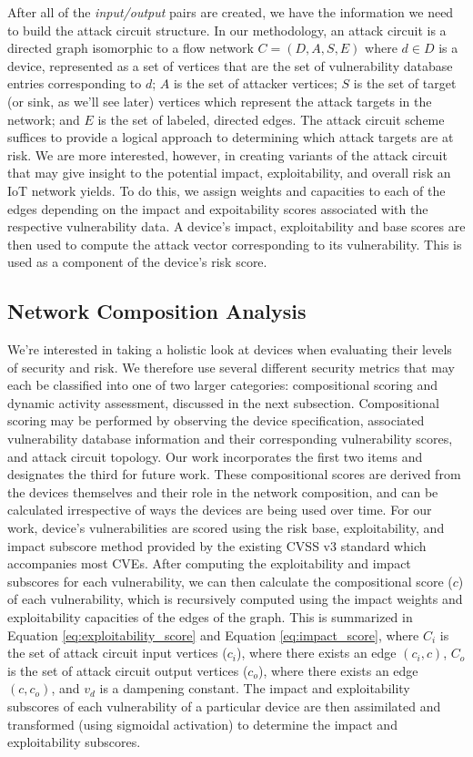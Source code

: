 After all of the \textit{input/output} pairs are created, we have the information we need to build the attack circuit structure. In our methodology, an attack circuit is a directed graph isomorphic to a flow network $C = (D,A,S,E)$ where $d \in D$ is a device, represented as a set of vertices that are the set of vulnerability database entries corresponding to $d$; $A$ is the set of attacker vertices; $S$ is the set of target (or sink, as we'll see later) vertices which represent the attack targets in the network; and $E$ is the set of labeled, directed edges. The attack circuit scheme suffices to provide a logical approach to determining which attack targets are at risk. We are more interested, however, in creating variants of the attack circuit that may give insight to the potential impact, exploitability, and overall risk an IoT network yields. To do this, we assign weights and capacities to each of the edges depending on the impact and expoitability scores associated with the respective vulnerability data. A device's impact, exploitability and base scores are then used to compute the attack vector corresponding to its vulnerability. This is used as a component of the device's risk score.

\subsection{Network Composition Analysis}

We're interested in taking a holistic look at devices when evaluating their levels of security and risk. We therefore use several different security metrics that may each be classified into one of two larger categories: compositional scoring and dynamic activity assessment, discussed in the next subsection. Compositional scoring may be performed by observing the device specification, associated vulnerability database information and their corresponding vulnerability scores, and attack circuit topology. Our work incorporates the first two items and designates the third for future work. These compositional scores are derived from the devices themselves and their role in the network composition, and can be calculated irrespective of ways the devices are being used over time. For our work, device's vulnerabilities are scored using the risk base, exploitability, and impact subscore method provided by the existing CVSS v3 standard which accompanies most CVEs. After computing the exploitability and impact subscores for each vulnerability, we can then calculate the compositional score ($c$) of each vulnerability, which is recursively computed using the impact weights and exploitability capacities of the edges of the graph. This is summarized in Equation \ref{eq:exploitability_score} and Equation \ref{eq:impact_score}, where $C_i$ is the set of attack circuit input vertices ($c_i$), where there exists an edge $(c_i,c)$, $C_o$ is the set of attack circuit output vertices ($c_o$), where there exists an edge $(c,c_o)$, and $v_d$ is a dampening constant. The impact and exploitability subscores of each vulnerability of a particular device are then assimilated and transformed (using sigmoidal activation) to determine the impact and exploitability subscores.

